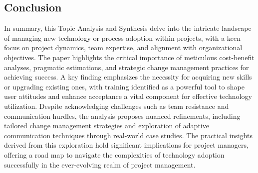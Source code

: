 \documentclass{article}
\begin{document}
\subsection{Conclusion}
In summary, this Topic Analysis and Synthesis delve into the intricate landscape of managing new technology or process adoption within projects, with a keen focus on project dynamics, team expertise, and alignment with organizational objectives. The paper highlights the critical importance of meticulous cost-benefit analyses, pragmatic estimations, and strategic change management practices for achieving success. A key finding emphasizes the necessity for acquiring new skills or upgrading existing ones, with training identified as a powerful tool to shape user attitudes and enhance acceptance a vital component for effective technology utilization. Despite acknowledging challenges such as team resistance and communication hurdles, the analysis proposes nuanced refinements, including tailored change management strategies and exploration of adaptive communication techniques through real-world case studies. The practical insights derived from this exploration hold significant implications for project managers, offering a road map to navigate the complexities of technology adoption successfully in the ever-evolving realm of project management.
\end{document}
